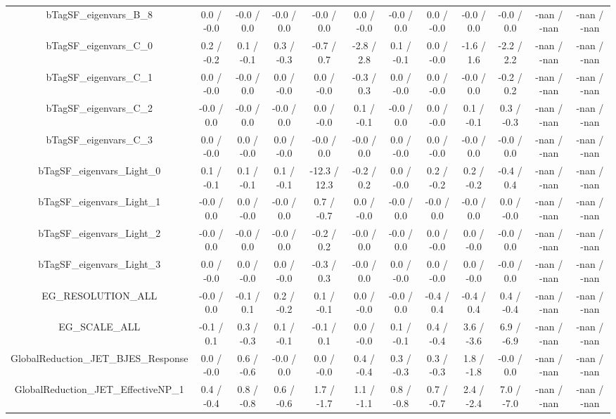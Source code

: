 \begin{table}[htbp]
\begin{center}
\begin{tabular}{|c|c|c|c|c|c|c|c|c|c|c|c|}
  bTagSF_eigenvars_B_8 & 0.0 / -0.0 & -0.0 / 0.0 & -0.0 / 0.0 & -0.0 / 0.0 & 0.0 / -0.0 & -0.0 / 0.0 & 0.0 / -0.0 & -0.0 / 0.0 & -0.0 / 0.0 & -nan / -nan & -nan / -nan \\ 
  bTagSF_eigenvars_C_0 & 0.2 / -0.2 & 0.1 / -0.1 & 0.3 / -0.3 & -0.7 / 0.7 & -2.8 / 2.8 & 0.1 / -0.1 & 0.0 / -0.0 & -1.6 / 1.6 & -2.2 / 2.2 & -nan / -nan & -nan / -nan \\ 
  bTagSF_eigenvars_C_1 & 0.0 / -0.0 & -0.0 / 0.0 & 0.0 / -0.0 & 0.0 / -0.0 & -0.3 / 0.3 & 0.0 / -0.0 & 0.0 / -0.0 & -0.0 / 0.0 & -0.2 / 0.2 & -nan / -nan & -nan / -nan \\ 
  bTagSF_eigenvars_C_2 & -0.0 / 0.0 & -0.0 / 0.0 & -0.0 / 0.0 & 0.0 / -0.0 & 0.1 / -0.1 & -0.0 / 0.0 & 0.0 / -0.0 & 0.1 / -0.1 & 0.3 / -0.3 & -nan / -nan & -nan / -nan \\ 
  bTagSF_eigenvars_C_3 & 0.0 / -0.0 & 0.0 / -0.0 & 0.0 / -0.0 & -0.0 / 0.0 & -0.0 / 0.0 & 0.0 / -0.0 & 0.0 / -0.0 & -0.0 / 0.0 & -0.0 / 0.0 & -nan / -nan & -nan / -nan \\ 
  bTagSF_eigenvars_Light_0 & 0.1 / -0.1 & 0.1 / -0.1 & 0.1 / -0.1 & -12.3 / 12.3 & -0.2 / 0.2 & 0.0 / -0.0 & 0.2 / -0.2 & 0.2 / -0.2 & -0.4 / 0.4 & -nan / -nan & -nan / -nan \\ 
  bTagSF_eigenvars_Light_1 & -0.0 / 0.0 & 0.0 / -0.0 & -0.0 / 0.0 & 0.7 / -0.7 & 0.0 / -0.0 & -0.0 / 0.0 & -0.0 / 0.0 & -0.0 / 0.0 & 0.0 / -0.0 & -nan / -nan & -nan / -nan \\ 
  bTagSF_eigenvars_Light_2 & -0.0 / 0.0 & -0.0 / 0.0 & -0.0 / 0.0 & -0.2 / 0.2 & -0.0 / 0.0 & -0.0 / 0.0 & 0.0 / -0.0 & 0.0 / -0.0 & -0.0 / 0.0 & -nan / -nan & -nan / -nan \\ 
  bTagSF_eigenvars_Light_3 & 0.0 / -0.0 & 0.0 / -0.0 & 0.0 / -0.0 & -0.3 / 0.3 & -0.0 / 0.0 & 0.0 / -0.0 & 0.0 / -0.0 & 0.0 / -0.0 & -0.0 / 0.0 & -nan / -nan & -nan / -nan \\ 
  EG_RESOLUTION_ALL & -0.0 / 0.0 & -0.1 / 0.1 & 0.2 / -0.2 & 0.1 / -0.1 & 0.0 / -0.0 & -0.0 / 0.0 & -0.4 / 0.4 & -0.4 / 0.4 & 0.4 / -0.4 & -nan / -nan & -nan / -nan \\ 
  EG_SCALE_ALL & -0.1 / 0.1 & 0.3 / -0.3 & 0.1 / -0.1 & -0.1 / 0.1 & 0.0 / -0.0 & 0.1 / -0.1 & 0.4 / -0.4 & 3.6 / -3.6 & 6.9 / -6.9 & -nan / -nan & -nan / -nan \\ 
  GlobalReduction_JET_BJES_Response & 0.0 / -0.0 & 0.6 / -0.6 & -0.0 / 0.0 & 0.0 / -0.0 & 0.4 / -0.4 & 0.3 / -0.3 & 0.3 / -0.3 & 1.8 / -1.8 & -0.0 / 0.0 & -nan / -nan & -nan / -nan \\ 
  GlobalReduction_JET_EffectiveNP_1 & 0.4 / -0.4 & 0.8 / -0.8 & 0.6 / -0.6 & 1.7 / -1.7 & 1.1 / -1.1 & 0.8 / -0.8 & 0.7 / -0.7 & 2.4 / -2.4 & 7.0 / -7.0 & -nan / -nan & -nan / -nan \\ 

\end{tabular}
\end{center}
\end{table}
